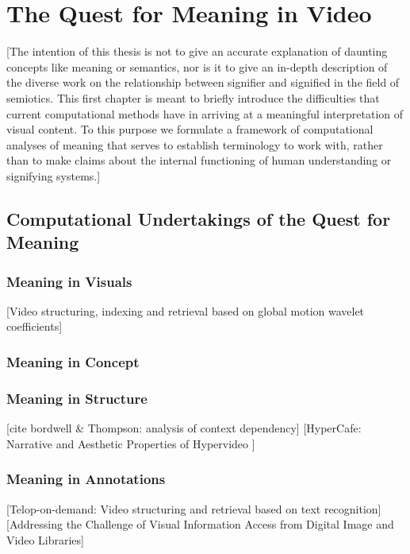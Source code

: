 \chapter{The Quest for Meaning in Video}
\label{ch:quest}

[The intention of this thesis is not to give an accurate explanation of daunting concepts like meaning or semantics, nor is it to give an in-depth description of the diverse work on the relationship between signifier and signified in the field of semiotics. This first chapter is meant to briefly introduce the difficulties that current computational methods have in arriving at a meaningful interpretation of visual content. To this purpose we formulate a framework of computational analyses of meaning that serves to establish terminology to work with, rather than to make claims about the internal functioning of human understanding or signifying systems.]

\section{Computational Undertakings of the Quest for Meaning}

\subsection{Meaning in Visuals}
[Video structuring, indexing and retrieval based on global motion wavelet coefficients]\cite{Bruno:2002tt}

\subsection{Meaning in Concept}
\subsection{Meaning in Structure}
[cite bordwell \& Thompson: analysis of context dependency]
[HyperCafe: Narrative and Aesthetic Properties of Hypervideo \cite{Sawhney:1996tk}]

\subsection{Meaning in Annotations}
[Telop-on-demand: Video structuring and retrieval based on text recognition]\cite{Kuwano:2000wy}
[Addressing the Challenge of Visual Information Access from Digital Image and Video Libraries]\cite{Christel:2005td}

